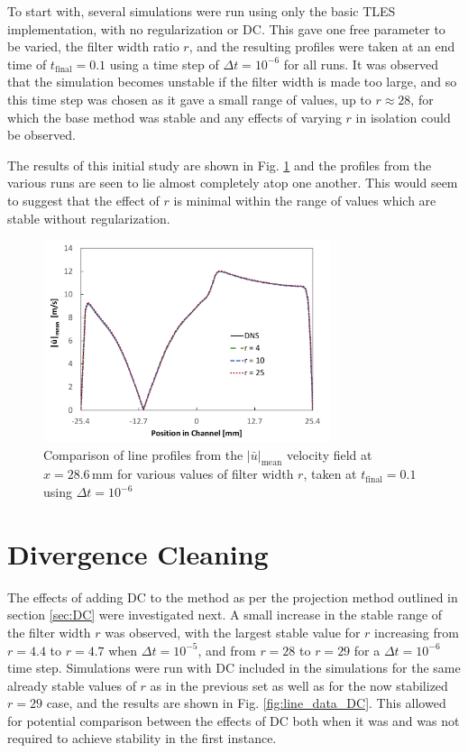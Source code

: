 To start with, several simulations were run using only the basic TLES implementation, with no regularization or DC. This gave one free parameter to be varied, the filter width ratio $r$, and the resulting profiles were taken at an end time of $t_\mathrm{final}=0.1$ using a time step of $\Delta t=10^{-6}$ for all runs. It was observed that the simulation becomes unstable if the filter width is made too large, and so this time step was chosen as it gave a small range of values, up to $r\approx 28$, for which the base method was stable and any effects of varying $r$ in isolation could be observed.

The results of this initial study are shown in Fig. \ref{fig:line_data_no_reg} and the profiles from the various runs are seen to lie almost completely atop one another. This would seem to suggest that the effect of $r$ is minimal within the range of values which are stable without regularization.

\begin{figure}[!htb]
\centering
\includegraphics[width=0.75\textwidth]{figures/line_data_no_reg.pdf}
\caption{Comparison of line profiles from the $|\bar{u}|_{\mathrm{mean}}$ velocity field at $x=28.6\,\mathrm{mm}$ for various values of filter width $r$, taken at $t_\mathrm{final}=0.1$ using $\Delta t=10^{-6}$}
\label{fig:line_data_no_reg}
\end{figure}

\section{Divergence Cleaning}

The effects of adding DC to the method as per the projection method outlined in section \ref{sec:DC} were investigated next. A small increase in the stable range of the filter width $r$ was observed, with the largest stable value for $r$ increasing from $r=4.4$ to $r=4.7$ when $\Delta t=10^{-5}$, and from $r=28$ to $r=29$ for a $\Delta t=10^{-6}$ time step. Simulations were run with DC included in the simulations for the same already stable values of $r$ as in the previous set as well as for the now stabilized $r=29$ case, and the results are shown in Fig. \ref{fig:line_data_DC}. This allowed for potential comparison between the effects of DC both when it was and was not required to achieve stability in the first instance.

